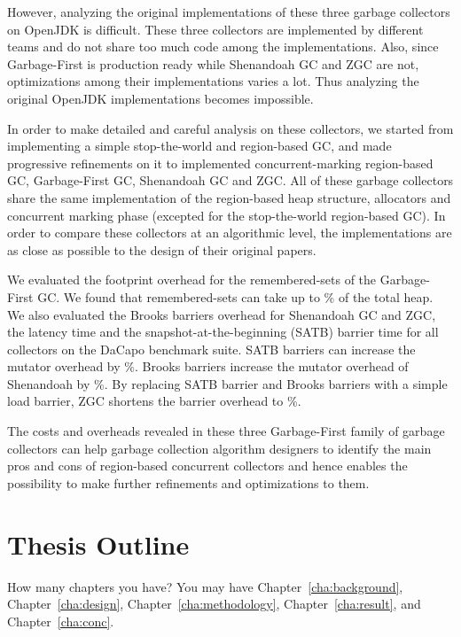 However, analyzing the original implementations of these three garbage
collectors on OpenJDK is difficult. These three collectors are implemented by
different teams and do not share too much code among the implementations. Also,
since Garbage-First is production ready while Shenandoah GC and ZGC are not,
optimizations among their implementations varies a lot. Thus analyzing the
original OpenJDK implementations becomes impossible.

In order to make detailed and careful analysis on these collectors, we started
from implementing a simple stop-the-world and region-based GC, and made
progressive refinements on it to implemented concurrent-marking region-based GC,
Garbage-First GC, Shenandoah GC and ZGC. All of these garbage collectors share
the same implementation of the region-based heap structure, allocators and
concurrent marking phase (excepted for the stop-the-world region-based GC). In
order to compare these collectors at an algorithmic level, the implementations
are as close as possible to the design of their original papers.

We evaluated the footprint overhead for the remembered-sets of the Garbage-First
GC. We found that remembered-sets can take up to \% of the total
heap. We also evaluated the Brooks barriers overhead for Shenandoah GC and ZGC, the latency
time and the snapshot-at-the-beginning (SATB) barrier time for all collectors
on the DaCapo benchmark suite. SATB barriers can increase the mutator overhead
by \%. Brooks barriers increase the mutator overhead of Shenandoah by
\%. By replacing SATB barrier and Brooks barriers with a simple load
barrier, ZGC shortens the barrier overhead to \%.

The costs and overheads revealed in these three Garbage-First family of garbage
collectors can help garbage collection algorithm designers to identify the main
pros and cons of region-based concurrent collectors and hence enables the
possibility to make further refinements and optimizations to them.

\section{Thesis Outline}
\label{sec:outline}
How many chapters you have? You may have Chapter~\ref{cha:background},
Chapter~\ref{cha:design}, Chapter~\ref{cha:methodology},
Chapter~\ref{cha:result}, and Chapter~\ref{cha:conc}.
